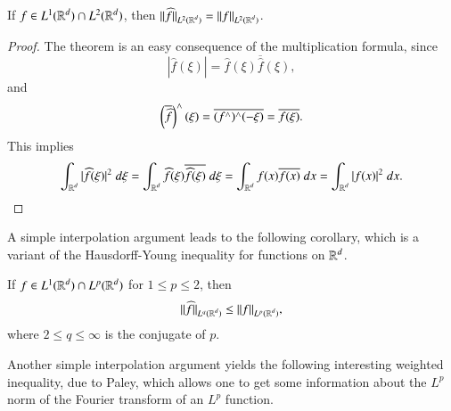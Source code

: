 \begin{theorem}
    If $f \in L^1(\operatorname{\mathbb{R}}^d) \cap L^2(\operatorname{\mathbb{R}}^d)$, then $\| \widehat{f} \|_{L^2(\operatorname{\mathbb{R}}^d)} = \| f \|_{L^2(\operatorname{\mathbb{R}}^d)}$.
\end{theorem}
\begin{proof}
    The theorem is an easy consequence of the multiplication formula, since
    \[ |\widehat{f}(\xi)| = \widehat{f}(\xi) \overline{\widehat{f}}(\xi), \]
    and
    \[ \left( \overline{\widehat{f}} \right)^\wedge(\xi) = \overline{(f^\wedge)^\wedge(-\xi)} = \overline{f(\xi)}. \]
    This implies
    \[ \int_{\operatorname{\mathbb{R}}^d} |\widehat{f}(\xi)|^2\; d\xi = \int_{\operatorname{\mathbb{R}}^d} \widehat{f}(\xi) \overline{\widehat{f}(\xi)}\; d\xi = \int_{\operatorname{\mathbb{R}}^d} f(x) \overline{f(x)}\; dx = \int_{\operatorname{\mathbb{R}}^d} |f(x)|^2\; dx. \qedhere \]
\end{proof}

A simple interpolation argument leads to the following corollary, which is a variant of the Hausdorff-Young inequality for functions on $\operatorname{\mathbb{R}}^d$.

\begin{corollary} If $f \in L^1(\operatorname{\mathbb{R}}^d) \cap L^p(\operatorname{\mathbb{R}}^d)$ for $1 \leq p \leq 2$, then
    \[ \| \widehat{f} \|_{L^q(\operatorname{\mathbb{R}}^d)} \leq \| f \|_{L^p(\operatorname{\mathbb{R}}^d)}, \]
    where $2 \leq q \leq \infty$ is the conjugate of $p$.
\end{corollary}

Another simple interpolation argument yields the following interesting weighted inequality, due to Paley, which allows one to get some information about the $L^p$ norm of the Fourier transform of an $L^p$ function.

